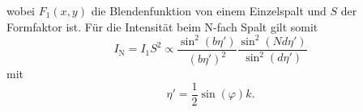 wobei $F_1(x,y)$ die Blendenfunktion von einem Einzelspalt und $S$ der Formfaktor ist.
Für die Intensität beim N-fach Spalt gilt somit
\begin{equation}
	I_\text{N} = I_1 S^2 \propto \frac{\sin^2(b \eta')}{(b\eta')^2}\frac{\sin^2(N d \eta')}{\sin^2(d\eta')}
\end{equation}
mit
\begin{equation}
	\eta'=\frac{1}{2} \sin(\varphi) k.
\end{equation}

